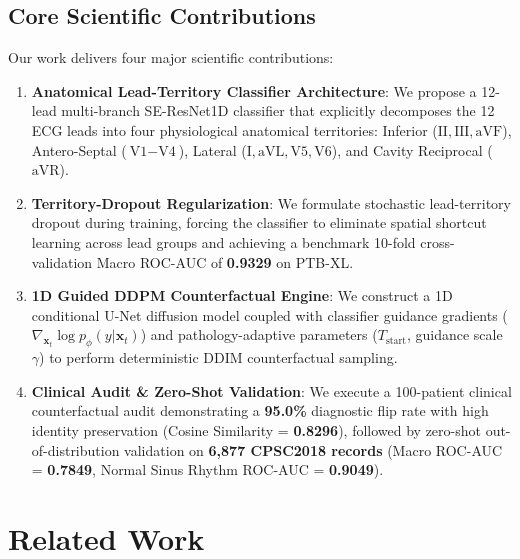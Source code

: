 \documentclass[5p,twocolumn,10pt]{elsarticle}
\begin{document}
\subsection{Core Scientific Contributions}
Our work delivers four major scientific contributions:
\begin{enumerate}
    \item \textbf{Anatomical Lead-Territory Classifier Architecture}: We propose a 12-lead multi-branch SE-ResNet1D classifier that explicitly decomposes the 12 ECG leads into four physiological anatomical territories: Inferior ($\text{II}, \text{III}, \text{aVF}$), Antero-Septal ($\text{V1}-\text{V4}$), Lateral ($\text{I}, \text{aVL}, \text{V5}, \text{V6}$), and Cavity Reciprocal ($\text{aVR}$).
    \item \textbf{Territory-Dropout Regularization}: We formulate stochastic lead-territory dropout during training, forcing the classifier to eliminate spatial shortcut learning across lead groups and achieving a benchmark 10-fold cross-validation Macro ROC-AUC of \textbf{0.9329} on PTB-XL.
    \item \textbf{1D Guided DDPM Counterfactual Engine}: We construct a 1D conditional U-Net diffusion model coupled with classifier guidance gradients ($\nabla_{\mathbf{x}_t} \log p_\phi(y|\mathbf{x}_t)$) and pathology-adaptive parameters ($T_{\text{start}}$, guidance scale $\gamma$) to perform deterministic DDIM counterfactual sampling.
    \item \textbf{Clinical Audit \& Zero-Shot Validation}: We execute a 100-patient clinical counterfactual audit demonstrating a \textbf{95.0\%} diagnostic flip rate with high identity preservation (Cosine Similarity = \textbf{0.8296}), followed by zero-shot out-of-distribution validation on \textbf{6,877 CPSC2018 records} (Macro ROC-AUC = \textbf{0.7849}, Normal Sinus Rhythm ROC-AUC = \textbf{0.9049}).
\end{enumerate}

\section{Related Work}
\label{sec:related}
\end{document}
